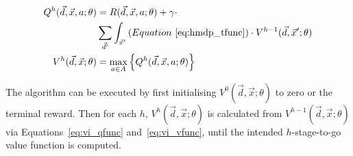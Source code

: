 {\footnotesize 
    \abovedisplayskip=0pt
    \belowdisplayskip=0pt
    \begin{align}
        Q^{h}(\vec{d}, \vec{x}, a; \theta) &= R(\vec{d}, \vec{x}, a; \theta) + \gamma \cdot  \nonumber \\ 
        & \sum_{\vec{d}'} \int_{\vec{x}'} \left( Equation~\eqref{eq:hmdp_tfunc} \right) \cdot V^{h-1}(\vec{d}, \vec{x}'; \theta) \label{eq:vi_qfunc} \\
        V^{h}(\vec{d}, \vec{x}; \theta) &= \max_{a \in A} \left\{ Q^{h}(\vec{d}, \vec{x}, a; \theta) \right\} \label{eq:vi_vfunc}
    \end{align}
}%

The algorithm can be executed by first initialising {\footnotesize $V^{0}(\vec{d}, \vec{x}; \theta)$}  to zero or the terminal reward. Then for each $h$, {\footnotesize $V^{h}(\vec{d}, \vec{x}; \theta)$} is calculated from {\footnotesize $V^{h-1}(\vec{d}, \vec{x}; \theta)$} via Equations~\eqref{eq:vi_qfunc} and~\eqref{eq:vi_vfunc}, until the intended $h$-stage-to-go value function is computed. 

